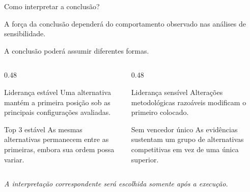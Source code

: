 \begin{frame}{Como interpretar a conclusão?}

    A força da conclusão dependerá do comportamento observado nas
    análises de sensibilidade.

    \vspace{0.3cm}

    A conclusão poderá assumir diferentes formas.

    \begin{columns}[T]

        \begin{column}{0.48\textwidth}

            \begin{block}{Liderança estável}
                Uma alternativa mantém a primeira posição sob as
                principais configurações avaliadas.
            \end{block}

            \begin{block}{Top 3 estável}
                As mesmas alternativas permanecem entre as primeiras,
                embora sua ordem possa variar.
            \end{block}

        \end{column}


        \begin{column}{0.48\textwidth}

            \begin{block}{Liderança sensível}
                Alterações metodológicas razoáveis modificam o primeiro
                colocado.
            \end{block}

            \begin{block}{Sem vencedor único}
                As evidências sustentam um grupo de alternativas
                competitivas em vez de uma única superior.
            \end{block}

        \end{column}

    \end{columns}

    \vspace{0.2cm}

    \centering
    \textit{A interpretação correspondente será escolhida somente após
    a execução.}

\end{frame}


